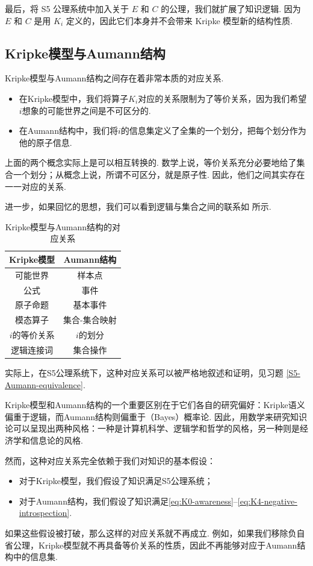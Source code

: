 最后，将 S5 公理系统中加入关于 $E$ 和 $C$ 的公理，我们就扩展了知识逻辑. 因为 $E$ 和 $C$ 是用 $K_i$ 定义的，因此它们本身并不会带来 Kripke 模型新的结构性质. 

\subsection{Kripke模型与Aumann结构}

Kripke模型与Aumann结构之间存在着非常本质的对应关系. 
\begin{itemize}
    \item 在Kripke模型中，我们将算子$K_i$对应的关系限制为了等价关系，因为我们希望$i$想象的可能世界之间是不可区分的. 
    \item 在Aumann结构中，我们将$i$的信息集定义了全集的一个划分，把每个划分作为他的原子信息. 
\end{itemize}

上面的两个概念实际上是可以相互转换的. 数学上说，等价关系充分必要地给了集合一个划分；从概念上说，所谓不可区分，就是原子性. 因此，他们之间其实存在一一对应的关系. 

进一步，如果回忆的思想，我们可以看到逻辑与集合之间的联系如 所示. 

\begin{table}[ht]
    \centering
    \begin{tabular}{c|c}
    \toprule
    Kripke模型 & Aumann结构 \\
    \midrule
    可能世界 & 样本点 \\
    公式 & 事件 \\
    原子命题 & 基本事件 \\
    模态算子 & 集合-集合映射 \\
    $i$的等价关系 & $i$的划分 \\
    逻辑连接词 & 集合操作 \\
    \bottomrule
    \end{tabular}
    \caption{Kripke模型与Aumann结构的对应关系} \label{tab:Kripke-Aumann}
\end{table}

实际上，在S5公理系统下，这种对应关系可以被严格地叙述和证明，见习题 \ref{S5-Aumann-equivalence}.

Kripke模型和Aumann结构的一个重要区别在于它们各自的研究偏好：Kripke语义偏重于逻辑，而Aumann结构则偏重于（Bayes）概率论. 因此，用数学来研究知识论可以呈现出两种风格：一种是计算机科学、逻辑学和哲学的风格，另一种则是经济学和信息论的风格. 

然而，这种对应关系完全依赖于我们对知识的基本假设：
\begin{itemize}
    \item 对于Kripke模型，我们假设了知识满足S5公理系统；
    \item 对于Aumann结构，我们假设了知识满足\eqref{eq:K0-awareness}--\eqref{eq:K4-negative-introspection}. 
\end{itemize}
如果这些假设被打破，那么这样的对应关系就不再成立. 例如，如果我们移除负自省公理，Kripke模型就不再具备等价关系的性质，因此不再能够对应于Aumann结构中的信息集. 

